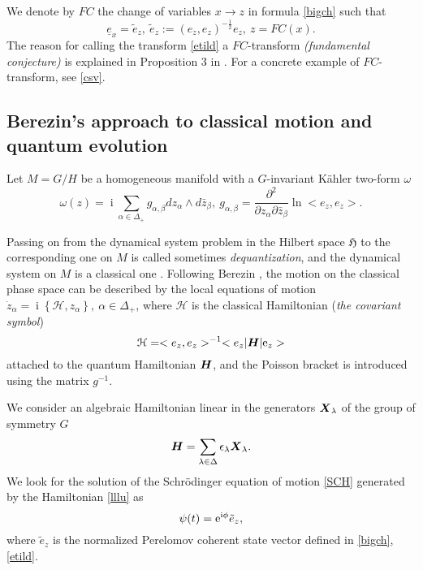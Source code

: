 \documentclass[12pt]{amsart}
\numberwithin{equation}{section}
\theoremstyle{definition}
\begin{document}
We denote by $FC$ the change of variables
$x\rightarrow z$ in formula \eqref{bigch} such that
\begin{equation}\label{etild}
\underline{e}_{x}=\tilde{e}_z, ~    \tilde{e}_z  :=
  (e_z,e_z)^{-\frac{1}{2}}e_z, ~z=FC(x). 
\end{equation}
The reason for calling the transform \eqref{etild}  a $FC$-transform  {\it
  (fundamental conjecture)}  \cite{GV,DN} is explained in Proposition
3 in \cite{ber14}. For a concrete example of $FC$-transform, see \eqref{csv}.

 \subsection{Berezin's approach to classical motion and quantum evolution}\label{CLSQ}

Let $M=G/H$ be a homogeneous  manifold with a $G$-invariant K\"ahler two-form
$\omega$
\begin{equation}\label{kall}
\omega(z)={\operatorname{i}}\sum_{\alpha\in\Delta_+} g_{\alpha,\beta}  d z_{\alpha}\wedge
d\bar{z}_{\beta}, ~g_{\alpha,\beta}=\frac{{\partial}^2}{{\partial}
  z_{\alpha} {\partial}\bar{z}_{\beta}} \ln  <e_z,e_z>. 
\end{equation}

Passing on from the dynamical system problem
 in the Hilbert space ${\ensuremath{{{\mathfrak{{H}}}}}}$ to the corresponding one on $M$ is called
sometimes {\it dequantization}, and the dynamical system on $M$ is a classical
one \cite{sbcag,sbl}. Following Berezin \cite{berezin2,berezin1}, the
motion on the classical phase space can be described by the local
equations of motion
$\dot{z}_{\alpha}={\operatorname{i}} \left\{{{\mathcal{{H}}}},z_{\alpha}\right\},
  ~\alpha \in \Delta_+ $, where ${{\mathcal{{H}}}}$ is
  the classical Hamiltonian  ({\it the covariant 
  symbol})
\begin{equation}\label{clH}{{\mathcal{{H}}}}=<e_z,e_z>^{-1}<e_z|{{\mbox{\boldmath{${H}$}}}}|{{\mbox{\rm e}}}_z>\end{equation}
  attached to
  the quantum Hamiltonian ${{\mbox{\boldmath{${H}$}}}}$, and the Poisson bracket is
  introduced using the matrix $g^{-1}$. 

We consider an algebraic Hamiltonian linear in the generators
${{{\mbox{\boldmath{${X}$}}}}}_{\lambda} $ of the
group of symmetry $G$
\begin{equation}\label{lllu}
{{\mbox{\boldmath{${H}$}}}}=\sum_{\lambda\in\Delta}\epsilon_{\lambda}{{{\mbox{\boldmath{${X}$}}}}}_{\lambda} .
\end{equation}
We look for the solution of the Schr\"odinger equation of motion
\eqref{SCH} generated by the Hamiltonian \eqref{lllu} 
as \begin{equation}\label{slSCH}
\psi(t)={{\mbox{\rm e}}}^{{\operatorname{i}} \phi}\tilde{e}_z,
\end{equation}
where $\tilde{e}_z$ is the normalized Perelomov coherent state vector
defined in \eqref{bigch}, \eqref{etild}.
\end{document}
